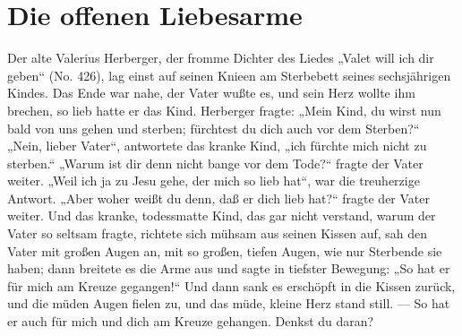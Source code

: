 \chapter{Die offenen Liebesarme}

Der alte Valerius Herberger, der fromme Dichter des Liedes „Valet will ich dir geben“ (No. 426), lag einst auf seinen Knieen am Sterbebett seines sechsjährigen Kindes. Das Ende war nahe, der Vater wußte es, und sein Herz wollte ihm brechen, so lieb hatte er das Kind. Herberger fragte: „Mein Kind, du wirst nun bald von uns gehen und sterben; fürchtest du dich auch vor dem Sterben?“ „Nein, lieber Vater“, antwortete das kranke Kind, „ich fürchte mich nicht zu sterben.“ „Warum ist dir denn nicht bange vor dem Tode?“ fragte der Vater weiter. „Weil ich ja zu Jesu gehe, der mich so lieb hat“, war die treuherzige Antwort. „Aber woher weißt du denn, daß er dich lieb hat?“ fragte der Vater weiter. Und das kranke, todessmatte Kind, das gar nicht verstand, warum der Vater so seltsam fragte, richtete sich mühsam aus seinen Kissen auf, sah den Vater mit großen Augen an, mit so großen, tiefen Augen, wie nur Sterbende sie haben; dann breitete es die Arme aus und sagte in tiefster Bewegung: „So hat er für mich am Kreuze gegangen!“ Und dann sank es erschöpft in die Kissen zurück, und die müden Augen fielen zu, und das müde, kleine Herz stand still. — So hat er auch für mich und dich am Kreuze gehangen. Denkst du daran?
